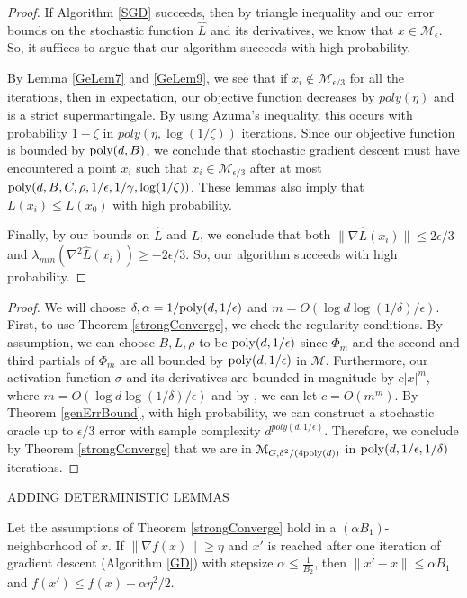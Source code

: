 \begin{proof}
If Algorithm \ref{SGD} succeeds, then by triangle inequality and our error bounds on the stochastic function $\widehat{L}$ and its derivatives, we know that $x \in \mathcal{M}_\epsilon$. So, it suffices to argue that our algorithm succeeds with high probability.

By Lemma \ref{GeLem7} and \ref{GeLem9}, we see that if
$x_i \not \in\mathcal{M}_{\epsilon/3}$ for all the iterations, then in
expectation, our objective function decreases by $poly(\eta)$ and is a strict supermartingale. By using Azuma's inequality, this occurs with probability
$1-\zeta$ in $poly(\eta,\log(1/\zeta))$ iterations. Since our objective function is bounded by $\mathrm{poly}(d,B)$, we conclude that stochastic gradient descent must have encountered a
point $x_i$ such that $x_i \in \mathcal{M}_{\epsilon/3}$ after at most
$\mathrm{poly}(d,B,C,\rho,1/\epsilon,1/\gamma, \log(1/\zeta))$. These lemmas also imply that $L(x_i) \leq L(x_0)$ with high probability.

Finally, by our bounds on $\widehat{L}$ and $L$, we conclude that both
$\|\nabla\widehat{L}(x_i)\| \leq 2\epsilon/3$ and $\lambda_{min}(\nabla^2 \widehat{L}(x_i)) \geq -2\epsilon/3$. So, our algorithm succeeds with high probability.
\end{proof}


\begin{proof}
We will choose $\delta, \alpha = 1/\mathrm{poly}(d,1/\epsilon)$ and $m = O(\log d \log (1/\delta)/\epsilon)$. First, to use Theorem \ref{strongConverge}, we check the regularity conditions. By assumption, we can choose $B, L, \rho$ to be $\mathrm{poly}(d,1/\epsilon)$ since $\Phi_m$ and the second and third partials of $\Phi_m$ are all bounded by $\mathrm{poly}(d,1/\epsilon)$ in $\mathcal{M}$. Furthermore, our activation function $\sigma$ and its derivatives are bounded in magnitude by $c|x|^{m}$, where $m = O(\log d \log (1/\delta)/\epsilon)$ and by \cite{Hermite}, we can let $c = O(m^m)$. By Theorem \ref{genErrBound}, with high probability, we can construct a stochastic oracle up to $\epsilon/3$ error with sample complexity $d^{poly(d,1/\epsilon)}$. Therefore, we conclude by Theorem \ref{strongConverge} that we are in $\mathcal{M}_{G,\delta^2/(4\mathrm{poly}(d))}$ in $\mathrm{poly}(d,1/\epsilon,1/\delta)$ iterations.
\end{proof}

ADDING DETERMINISTIC LEMMAS


\begin{lemma}\label{GradDecrease}		
Let the assumptions of Theorem \ref{strongConverge} hold in a $(\alpha B_1)$-neighborhood of $x$. If $\|\nabla f (x) \|\geq \eta$ and $x'$ is reached after one iteration of gradient descent (Algorithm \ref{GD}) with stepsize $\alpha \leq \frac{1}{B_2}$, then $\|x' - x\| \leq \alpha B_1$ and $f(x') \leq f(x) - \alpha\eta^2/2$.
\end{lemma} 

